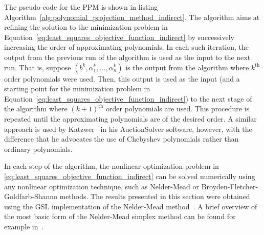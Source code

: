 The pseudo-code for the PPM is shown in listing Algorithm~\ref{alg:polynomial_projection_method_indirect}. The algorithm aims at refining the solution to the minimization problem in Equation~\eqref{eq:least_squares_objective_function_indirect} by successively increasing the order of approximating polynomials. In each such iteration, the output from the previous run of the algorithm is used as the input to the next run. That is, suppose $(\underline{b}^k, \alpha_1^k, \dotsc, \alpha_n^k)$ is the output from the algorithm where $k^\textrm{th}$ order polynomials were used. Then, this output is used as the input (and a starting point for the minimization problem in Equation~\eqref{eq:least_squares_objective_function_indirect}) to the next stage of the algorithm where $(k+1)^\textrm{th}$ order polynomials are used. This procedure is repeated until the approximating polynomials are of the desired order. A similar approach is used by Katzwer~\cite{Katzwer2012} in his AuctionSolver software, however, with the difference that he advocates the use of Chebyshev polynomials rather than ordinary polynomials.

In each step of the algorithm, the nonlinear optimization problem in \eqref{eq:least_squares_objective_function_indirect} can be solved numerically using any nonlinear optimization technique, such as Nelder-Mead or Broyden-Fletcher-Goldfarb-Shanno methods. The results presented in this section were obtained using the GSL implementation of the Nelder-Mead method~\cite{GSL}. A brief overview of the most basic form of the Nelder-Mead simplex method can be found for example in~\cite{AvrielPenalty2003}.

